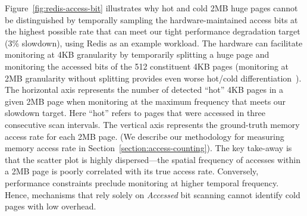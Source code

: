 Figure~\ref{fig:redis-access-bit} illustrates why hot and cold 2MB huge pages 
cannot be distinguished by temporally sampling
the hardware-maintained access bits at the highest possible rate that can meet
our tight performance degradation target (3\% slowdown), using Redis as an example workload.
The hardware can facilitate 
monitoring at 4KB granularity by temporarily splitting a huge page and monitoring
the accessed bits of the 512 constituent 4KB pages (monitoring at 2MB granularity
without splitting provides even worse hot/cold
differentiation~\cite{ref:Guo:2015:PBL:2731186.2731187}). The horizontal axis 
represents the number of detected ``hot'' 4KB pages
in a given 2MB page when monitoring at the maximum frequency that meets our slowdown target. Here
``hot'' refers to pages that were accessed in three consecutive scan intervals.
The vertical axis represents the ground-truth memory access rate for each 2MB page. 
(We describe our methodology for measuring memory access rate in
Section~\ref{section:access-counting}). 
The key take-away is that the scatter plot is highly dispersed---the spatial frequency
of accesses within a 2MB page is poorly correlated with its true access rate.
Conversely, performance constraints preclude monitoring at higher temporal
frequency. Hence, mechanisms that rely solely on {\it Accessed} bit scanning
cannot identify cold pages with low overhead.

